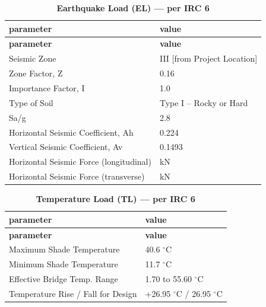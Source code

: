 \documentclass[12pt,a4paper]{report}
\numberwithin{table}{chapter}
\numberwithin{figure}{chapter}
\begin{document}
\vspace{1em}
\begin{longtable}{|L{5.5cm}|p{10.0cm}|}
\caption{\textbf{Earthquake Load (EL) --- per IRC 6}}\\
\hline
\textbf{parameter} & \textbf{value} \\
\hline
\endfirsthead

\hline
\textbf{parameter} & \textbf{value} \\
\hline
\endhead
\hline
\endlastfoot
\textnormal{Seismic Zone} & III [from Project Location] \\[6pt]
\hline
\textnormal{Zone Factor, Z} & 0.16 \\[6pt]
\hline
\textnormal{Importance Factor, I} & 1.0 \\[6pt]
\hline
\textnormal{Type of Soil} & Type I – Rocky or Hard \\[6pt]
\hline
\textnormal{Sa/g} & 2.8 \\[6pt]
\hline
\textnormal{Horizontal Seismic Coefficient, Ah} & 0.224 \\[6pt]
\hline
\textnormal{Vertical Seismic Coefficient, Av} & 0.1493 \\[6pt]
\hline
\textnormal{Horizontal Seismic Force (longitudinal)} &  kN \\[6pt]
\hline
\textnormal{Horizontal Seismic Force (transverse)} &  kN \\[6pt]
\end{longtable}

\vspace{1em}
\begin{longtable}{|L{5.5cm}|p{10.0cm}|}
\caption{\textbf{Temperature Load (TL) --- per IRC 6}}\\
\hline
\textbf{parameter} & \textbf{value} \\
\hline
\endfirsthead

\hline
\textbf{parameter} & \textbf{value} \\
\hline
\endhead
\hline
\endlastfoot
\textnormal{Maximum Shade Temperature} & 40.6 $^\circ$C \\[6pt]
\hline
\textnormal{Minimum Shade Temperature} & 11.7 $^\circ$C \\[6pt]
\hline
\textnormal{Effective Bridge Temp. Range} & 1.70 to 55.60 $^\circ$C \\[6pt]
\hline
\textnormal{Temperature Rise / Fall for Design} & +26.95 $^\circ$C / \textminus{}26.95 $^\circ$C \\[6pt]
\end{longtable}
\end{document}
